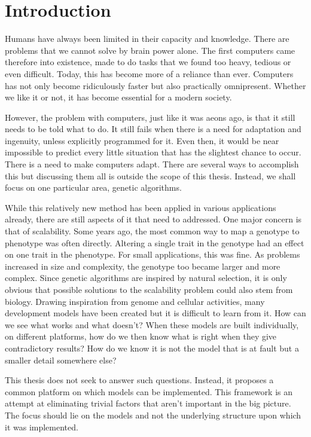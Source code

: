 \section{Introduction}
Humans have always been limited in their capacity and knowledge. There are problems that we cannot solve by brain power alone. The first computers came therefore into existence, made to do tasks that we found too heavy, tedious or even difficult. Today, this has become more of a reliance than ever. Computers has not only become ridiculously faster but also practically omnipresent. Whether we like it or not, it has become essential for a modern society.

However, the problem with computers, just like it was aeons ago, is that it still needs to be told what to do. It still fails when there is a need for adaptation and ingenuity, unless explicitly programmed for it. Even then, it would be near impossible to predict every little situation that has the slightest chance to occur. There is a need to make computers adapt. There are several ways to accomplish this but discussing them all is outside the scope of this thesis. Instead, we shall focus on one particular area, genetic algorithms.

While this relatively new method has been applied in various applications already, there are still aspects of it that need to addressed. One major concern is that of scalability. Some years ago, the most common way to map a genotype to phenotype was often directly. Altering a single trait in the genotype had an effect on one trait in the phenotype. For small applications, this was fine. As problems increased in size and complexity, the genotype too became larger and more complex. Since genetic algorithms are inspired by natural selection, it is only obvious that possible solutions to the scalability problem could also stem from biology. Drawing inspiration from genome and cellular activities, many development models have been created but it is difficult to learn from it. How can we see what works and what doesn't? When these models are built individually, on different platforms, how do we then know what is right when they give contradictory results? How do we know it is not the model that is at fault but a smaller detail somewhere else?

This thesis does not seek to answer such questions. Instead, it proposes a common platform on which models can be implemented. This framework is an attempt at eliminating trivial factors that aren't important in the big picture. The focus should lie on the models and not the underlying structure upon which it was implemented.

